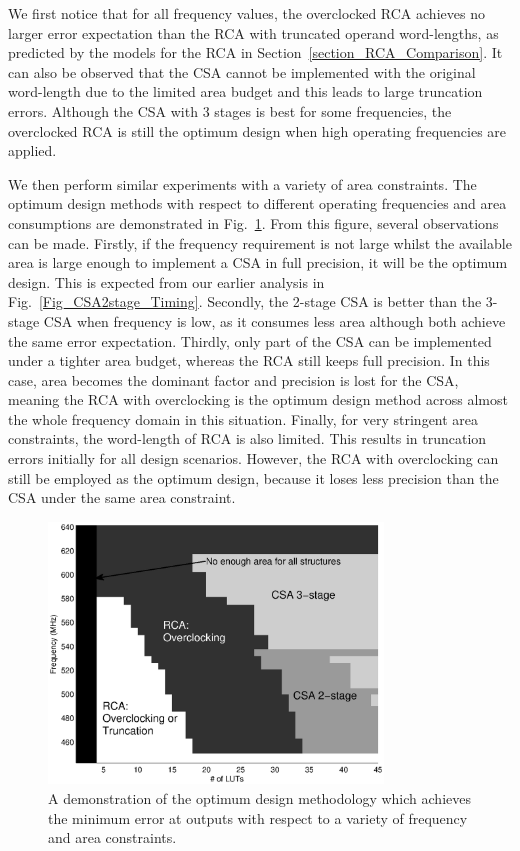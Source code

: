 \documentclass[prodmode,acmtrets]{acmsmall} %
\begin{document}
We first notice that for all frequency values, the overclocked RCA achieves no larger error expectation than the RCA with truncated operand word-lengths, as predicted by the models for the RCA in Section~\ref{section_RCA_Comparison}. It can also be observed that the CSA cannot be implemented with the original word-length due to the limited area budget and this leads to large truncation errors. Although the CSA with 3 stages is best for some frequencies, the overclocked RCA is still the optimum design when high operating frequencies are applied.

We then perform similar experiments with a variety of area constraints. The optimum design methods with respect to different operating frequencies and area consumptions are demonstrated in Fig.~\ref{Fig_CSA_Tradeoff}. From this figure, several observations can be made. Firstly, if the frequency requirement is not large whilst the available area is large enough to implement a CSA in full precision, it will be the optimum design. This is expected from our earlier analysis in Fig.~\ref{Fig_CSA2stage_Timing}. Secondly, the 2-stage CSA is better than the 3-stage CSA when frequency is low, as it consumes less area although both achieve the same error expectation. Thirdly, only part of the CSA can be implemented under a tighter area budget, whereas the RCA still keeps full precision. In this case, area becomes the dominant factor and precision is lost for the CSA, meaning the RCA with overclocking is the optimum design method across almost the whole frequency domain in this situation. Finally, for very stringent area constraints, the word-length of RCA is also limited. This results in truncation errors initially for all design scenarios. However, the RCA with overclocking can still be employed as the optimum design, because it loses less precision than the CSA under the same area constraint.
%
\begin{figure}[t]
  \centering
  \vspace{-2ex}
  \includegraphics[width=3.5in]{./Figures/Tradeoff.eps}
  \vspace{-2ex}
  \caption{A demonstration of the optimum design methodology which achieves the minimum error at outputs with respect to a variety of frequency and area constraints.}
  \label{Fig_CSA_Tradeoff}
\end{figure}
\end{document}
